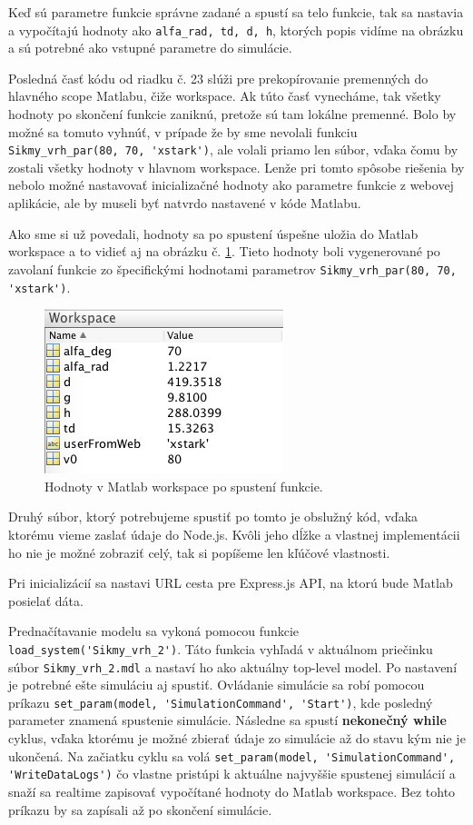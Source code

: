 Keď sú parametre funkcie správne zadané a spustí sa telo funkcie, tak sa nastavia a vypočítajú hodnoty ako \verb|alfa_rad, td, d, h|, ktorých popis vidíme na obrázku a sú potrebné ako vstupné parametre do simulácie.

Posledná časť kódu od riadku č. 23 slúži pre prekopírovanie premenných do hlavného scope Matlabu, čiže workspace. Ak túto časť vynecháme, tak všetky hodnoty po skončení funkcie zaniknú, pretože sú tam lokálne premenné. Bolo by možné sa tomuto vyhnúť, v prípade že by sme nevolali funkciu \verb|Sikmy_vrh_par(80, 70, 'xstark')|, ale volali priamo len súbor, vďaka čomu by zostali všetky hodnoty v hlavnom workspace. Lenže pri tomto spôsobe riešenia by nebolo možné nastavovať inicializačné hodnoty ako parametre funkcie z webovej aplikácie, ale by museli byť natvrdo nastavené v kóde Matlabu.

Ako sme si už povedali, hodnoty sa po spustení úspešne uložia do Matlab workspace a to vidieť aj na obrázku č. \ref{matlab-function-workspace}. Tieto hodnoty boli vygenerované po zavolaní funkcie zo špecifickými hodnotami parametrov \verb|Sikmy_vrh_par(80, 70, 'xstark')|.

\begin{figure}[H]
  \centering
  \includegraphics[scale=0.7]{img/code/matlab-function-workspace.png}
  \caption{Hodnoty v Matlab workspace po spustení funkcie.}
  \label{matlab-function-workspace}
\end{figure}

Druhý súbor, ktorý potrebujeme spustiť po tomto je obslužný kód, vďaka ktorému vieme zaslať údaje do Node.js. Kvôli jeho dĺžke a vlastnej implementácii ho nie je možné zobraziť celý, tak si popíšeme len kľúčové vlastnosti.

Pri inicializácií sa nastavi URL cesta pre Express.js API, na ktorú bude Matlab posielať dáta.

Prednačítavanie modelu sa vykoná pomocou funkcie \verb|load_system('Sikmy_vrh_2')|. Táto funkcia vyhľadá v aktuálnom priečinku súbor \verb|Sikmy_vrh_2.mdl| a nastaví ho ako aktuálny top-level model. Po nastavení je potrebné ešte simuláciu aj spustiť. Ovládanie simulácie sa robí pomocou príkazu \verb|set_param(model, 'SimulationCommand', 'Start')|, kde posledný parameter znamená spustenie simulácie.
Následne sa spustí \textbf{nekonečný while} cyklus, vďaka ktorému je možné zbierať údaje zo simulácie až do stavu kým nie je ukončená. 
Na začiatku cyklu sa volá \verb|set_param(model, 'SimulationCommand',| \\ \verb|'WriteDataLogs')| čo vlastne pristúpi k aktuálne najvyššie spustenej simulácií a snaží sa realtime zapisovať vypočítané hodnoty do Matlab workspace. Bez tohto príkazu by sa zapísali až po skončení simulácie.


